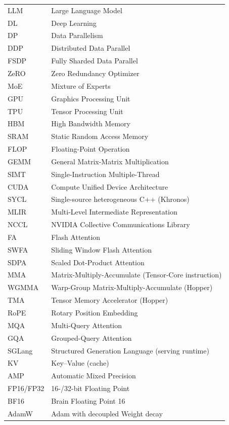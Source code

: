 \begin{longtable}[l]{l l}
LLM     & Large Language Model \\
DL      & Deep Learning \\
DP      & Data Parallelism \\
DDP     & Distributed Data Parallel \\
FSDP    & Fully Sharded Data Parallel \\
ZeRO    & Zero Redundancy Optimizer \\
MoE     & Mixture of Experts \\
GPU     & Graphics Processing Unit \\
TPU     & Tensor Processing Unit \\
HBM     & High Bandwidth Memory \\
SRAM    & Static Random Access Memory \\
FLOP    & Floating-Point Operation \\
GEMM    & General Matrix-Matrix Multiplication \\
SIMT    & Single-Instruction Multiple-Thread \\
CUDA    & Compute Unified Device Architecture \\
SYCL    & Single-source heterogeneous C++ (Khronos) \\
MLIR    & Multi-Level Intermediate Representation \\
NCCL    & NVIDIA Collective Communications Library \\
FA      & Flash Attention \\
SWFA    & Sliding Window Flash Attention \\
SDPA    & Scaled Dot-Product Attention \\
MMA     & Matrix-Multiply-Accumulate (Tensor-Core instruction) \\
WGMMA   & Warp-Group Matrix-Multiply-Accumulate (Hopper) \\
TMA     & Tensor Memory Accelerator (Hopper) \\
RoPE    & Rotary Position Embedding \\
MQA     & Multi-Query Attention \\
GQA     & Grouped-Query Attention \\
SGLang  & Structured Generation Language (serving runtime) \\
KV      & Key--Value (cache) \\
AMP     & Automatic Mixed Precision \\
FP16/FP32 & 16-/32-bit Floating Point \\
BF16    & Brain Floating Point 16 \\
AdamW   & Adam with decoupled Weight decay \\
\end{longtable}
